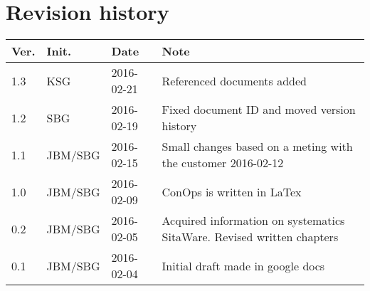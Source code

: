 \chapter*{Revision history}
\label{app:rev_his}

\begin{tabular}{b{1cm} b{2cm} b{2cm} b{7cm}}
    \textbf{Ver.} & \textbf{Init.} & \textbf{Date} & \textbf{Note} \\
    \hline 
    1.3  & KSG		& 2016-02-21 & Referenced documents added\\
    1.2  & SBG		& 2016-02-19 & Fixed document ID and moved version history\\
    1.1  & JBM/SBG	& 2016-02-15 & Small changes based on a meting with the customer 2016-02-12\\
    1.0  & JBM/SBG	& 2016-02-09 & ConOps is written in LaTex \\
    0.2  & JBM/SBG	& 2016-02-05 & Acquired information on systematics SitaWare. Revised written chapters \\
    0.1  & JBM/SBG	& 2016-02-04 & Initial draft made in google docs \\
\end{tabular}